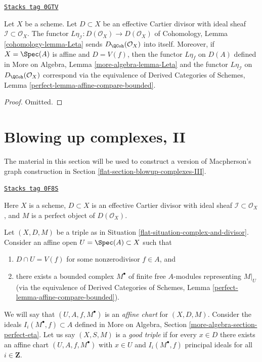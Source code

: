 \begin{lemma}[Leta]
\label{flat-lemma-Leta}
\href{https://stacks.math.columbia.edu/tag/0GTV}{\texttt{Stacks tag 0GTV}}

Let $X$ be a scheme. Let $D \subset X$ be an effective
Cartier divisor with ideal sheaf $\mathcal{I} \subset \mathcal{O}_X$.
The functor $L\eta_\mathcal{I} : D(\mathcal{O}_X) \to D(\mathcal{O}_X)$ of
Cohomology, Lemma \ref{cohomology-lemma-Leta} sends
$D_\QCoh(\mathcal{O}_X)$ into itself.
Moreover, if $X = \Spec(A)$ is affine and $D = V(f)$,
then the functor $L\eta_f$ on $D(A)$ defined in
More on Algebra, Lemma \ref{more-algebra-lemma-Leta}
and the functor $L\eta_\mathcal{I}$ on $D_\QCoh(\mathcal{O}_X)$
correspond via the equivalence of Derived Categories of Schemes, Lemma
\ref{perfect-lemma-affine-compare-bounded}.
\end{lemma}

\begin{proof}
Omitted.
\end{proof}

\section{Blowing up complexes, II}
\label{flat-section-blowup-complexes-II}
The material in this section will be used to construct a version of
Macpherson's graph construction in Section \ref{flat-section-blowup-complexes-III}.

\begin{definition}
\label{flat-situation-complex-and-divisor}
\href{https://stacks.math.columbia.edu/tag/0F8S}{\texttt{Stacks tag 0F8S}}

Here $X$ is a scheme, $D \subset X$ is an effective Cartier divisor
with ideal sheaf $\mathcal{I} \subset \mathcal{O}_X$, and
$M$ is a perfect object of $D(\mathcal{O}_X)$.
\end{definition}

Let $(X, D, M)$ be a triple as in
Situation \ref{flat-situation-complex-and-divisor}.
Consider an affine open $U = \Spec(A) \subset X$
such that
\begin{enumerate}
\item $D \cap U = V(f)$ for some nonzerodivisor $f \in A$, and
\item there exists a bounded complex $M^\bullet$ of
finite free $A$-modules representing $M|_U$ (via the equivalence of
Derived Categories of Schemes, Lemma
\ref{perfect-lemma-affine-compare-bounded}).
\end{enumerate}
We will say that $(U, A, f, M^\bullet)$ is an
{\it affine chart} for $(X, D, M)$.
Consider the ideals $I_i(M^\bullet, f) \subset A$ defined in
More on Algebra, Section \ref{more-algebra-section-perfect-eta}.
Let us say $(X, S, M)$ is a {\it good triple} if for every $x \in D$
there exists an affine chart $(U, A, f, M^\bullet)$
with $x \in U$ and $I_i(M^\bullet, f)$ principal ideals for all
$i \in \mathbf{Z}$.


